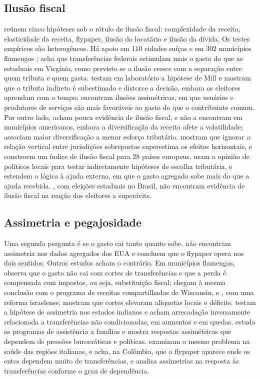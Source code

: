 \documentclass[10pt,twocolumn]{article}
\begin{document}
\subsection{Ilusão fiscal}
\citet{dollery1996} reúnem cinco hipóteses sob o rótulo de ilusão fiscal: complexidade da receita, elasticidade da receita, flypaper, ilusão do locatário e ilusão da dívida. Os testes empíricos são heterogêneos. Há apoio em 110 cidades suíças \citep{pommerehne1978} e em 302 municípios flamengos \citep{heyndels1994}; \citet{grossman1990} acha que transferências federais estimulam mais o gasto do que as estaduais em Virgínia, como previsto se a ilusão cresce com a separação entre quem tributa e quem gasta. \citet{sausgruber2005} testam em laboratório a hipótese de Mill e mostram que o tributo indireto é subestimado e distorce a decisão, embora os eleitores aprendam com o tempo; \citet{winter2001} encontram ilusões assimétricas, em que usuários e produtores de serviços são mais favoráveis ao gasto do que o contribuinte comum. Por outro lado, \citet{misiolek1988} acham pouca evidência de ilusão fiscal, e \citet{carroll2009} não a encontram em municípios americanos, embora a diversificação da receita afete a volatilidade; \citet{hendrick2002} associam maior diversificação a menor esforço tributário. \citet{campbell2004} mostram que ignorar a relação vertical entre jurisdições sobrepostas superestima os efeitos horizontais, e \citet{dellanno2014} constroem um índice de ilusão fiscal para 28 países europeus. \citet{ashworth1997} usam a opinião de políticos locais para testar indiretamente hipóteses de escolha tributária, e \citet{mcgillivray2001} estendem a lógica à ajuda externa, em que o gasto agregado sobe mais do que a ajuda recebida. \citet{arvate2009}, com eleições estaduais no Brasil, não encontram evidência de ilusão fiscal na reação dos eleitores a superávits.

\subsection{Assimetria e pegajosidade}
Uma segunda pergunta é se o gasto cai tanto quanto sobe. \citet{gamkhar1996} não encontram assimetria nos dados agregados dos EUA e concluem que o flypaper opera nos dois sentidos. Outros estudos acham o contrário. Em municípios flamengos, \citet{heyndels2001} observa que o gasto não cai com cortes de transferências e que a perda é compensada com impostos, ou seja, substituição fiscal; \citet{deller2006} chegam à mesma conclusão com o programa de receitas compartilhadas de Wisconsin, e \citet{shani2023}, com uma reforma israelense, mostram que cortes elevaram alíquotas locais e déficits. \citet{dash2013} testam a hipótese de assimetria nos estados indianos e acham arrecadação inversamente relacionada a transferências não condicionadas, em aumentos e em quedas. \citet{volden1999} estuda os programas de assistência a famílias e mostra respostas assimétricas que dependem de pressões burocráticas e políticas. \citet{levaggi2003} examinam o mesmo problema na saúde das regiões italianas, e \citet{melo2002} acha, na Colômbia, que o flypaper aparece onde os entes dependem muito de transferências, e analisa assimetrias na resposta às transferências conforme o grau de dependência.
\end{document}

